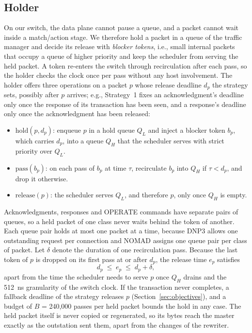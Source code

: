 \documentclass[conference]{IEEEtran}
\begin{document}
\subsection{Holder}
\label{sec:holder}

On our switch, the data plane cannot pause a queue, and a packet cannot wait inside a match/action stage. We therefore hold a packet in a queue of the traffic manager and decide its release with \emph{blocker tokens}, i.e., small internal packets that occupy a queue of higher priority and keep the scheduler from serving the held packet. A token re-enters the switch through recirculation after each pass, so the holder checks the clock once per pass without any host involvement. The holder offers three operations on a packet $p$ whose release deadline $d_p$ the strategy sets, possibly after $p$ arrives; e.g., Strategy~1 fixes an acknowledgment's deadline only once the response of its transaction has been seen, and a response's deadline only once the acknowledgment has been released:
\begin{itemize}[leftmargin=*,labelindent=0pt,topsep=2pt,itemsep=1pt,parsep=0pt]
\item $\mathrm{hold}(p, d_p)$: enqueue $p$ in a hold queue $Q_L$ and inject a blocker token $b_p$, which carries $d_p$, into a queue $Q_H$ that the scheduler serves with strict priority over $Q_L$.
\item $\mathrm{pass}(b_p)$: on each pass of $b_p$ at time $\tau$, recirculate $b_p$ into $Q_H$ if $\tau < d_p$, and drop it otherwise.
\item $\mathrm{release}(p)$: the scheduler serves $Q_L$, and therefore $p$, only once $Q_H$ is empty.
\end{itemize}
Acknowledgments, responses and OPERATE commands have separate pairs of queues, so a held packet of one class never waits behind the token of another. Each queue pair holds at most one packet at a time, because DNP3 allows one outstanding request per connection and NOMAD assigns one queue pair per class of packet. Let $\delta$ denote the duration of one recirculation pass. Because the last token of $p$ is dropped on its first pass at or after $d_p$, the release time $e_p$ satisfies
\begin{equation}
\label{eq:holder}
d_p \;\leq\; e_p \;\leq\; d_p + \delta ,
\end{equation}
apart from the time the scheduler needs to serve $p$ once $Q_H$ drains and the 512~ns granularity of the switch clock. If the transaction never completes, a fallback deadline of the strategy releases $p$ (Section~\ref{sec:objectives}), and a budget of $B$ = 240,000 passes per held packet bounds the hold in any case. The held packet itself is never copied or regenerated, so its bytes reach the master exactly as the outstation sent them, apart from the changes of the rewriter.
\end{document}
